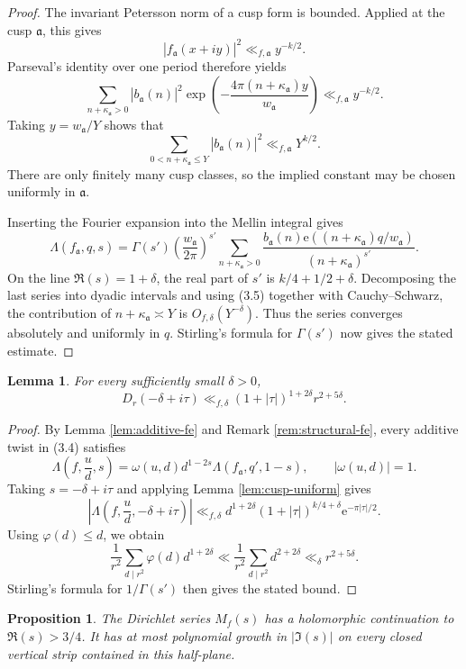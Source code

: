 \documentclass[11pt]{amsart}
\newtheorem{lemma}[theorem]{Lemma}
\newtheorem{proposition}[theorem]{Proposition}
\theoremstyle{remark}
\newcommand{\e}{\mathrm{e}}
\begin{document}
\begin{proof}
The invariant Petersson norm of a cusp form is bounded. Applied at the cusp
$\mathfrak a$, this gives
\[
|f_{\mathfrak a}(x+iy)|^2\ll_{f,\mathfrak a}y^{-k/2}.
\]
Parseval's identity over one period therefore yields
\[
\sum_{n+\kappa_{\mathfrak a}>0}|b_{\mathfrak a}(n)|^2
\exp\left(-\frac{4\pi(n+\kappa_{\mathfrak a})y}
{w_{\mathfrak a}}\right)
\ll_{f,\mathfrak a}y^{-k/2}.
\]
Taking $y=w_{\mathfrak a}/Y$ shows that
\[
\sum_{0<n+\kappa_{\mathfrak a}\le Y}|b_{\mathfrak a}(n)|^2
\ll_{f,\mathfrak a}Y^{k/2}.
\tag{3.5}
\]
There are only finitely many cusp classes, so the implied constant may be
chosen uniformly in $\mathfrak a$.

Inserting the Fourier expansion into the Mellin integral gives
\[
\Lambda(f_{\mathfrak a},q,s)
=\Gamma(s')\left(\frac{w_{\mathfrak a}}{2\pi}\right)^{s'}
\sum_{n+\kappa_{\mathfrak a}>0}
\frac{b_{\mathfrak a}(n)
\e((n+\kappa_{\mathfrak a})q/w_{\mathfrak a})}
{(n+\kappa_{\mathfrak a})^{s'}}.
\]
On the line $\Re(s)=1+\delta$, the real part of $s'$ is
$k/4+1/2+\delta$. Decomposing the last series into dyadic intervals and
using (3.5) together with Cauchy--Schwarz, the contribution of
$n+\kappa_{\mathfrak a}\asymp Y$ is $O_{f,\delta}(Y^{-\delta})$.
Thus the series converges absolutely and uniformly in $q$. Stirling's
formula for $\Gamma(s')$ now gives the stated estimate.
\end{proof}

\begin{lemma}\label{lem:left-bound}
For every sufficiently small $\delta>0$,
\[
D_r(-\delta+i\tau)\ll_{f,\delta}(1+|\tau|)^{1+2\delta}r^{2+5\delta}.
\]
\end{lemma}

\begin{proof}
By Lemma \ref{lem:additive-fe} and Remark \ref{rem:structural-fe}, every additive twist in (3.4) satisfies
\[
\Lambda\left(f,\frac ud,s\right)
=\omega(u,d)d^{1-2s}\Lambda(f_{\mathfrak a},q',1-s),
\qquad |\omega(u,d)|=1.
\]
Taking $s=-\delta+i\tau$ and applying Lemma \ref{lem:cusp-uniform} gives
\[
\left|\Lambda\left(f,\frac ud,-\delta+i\tau\right)\right|
\ll_{f,\delta}d^{1+2\delta}(1+|\tau|)^{k/4+\delta}\e^{-\pi|\tau|/2}.
\]
Using \(\varphi(d)\leq d\), we obtain
\[
\frac1{r^2}\sum_{d\mid r^2}\varphi(d)d^{1+2\delta}
\ll
\frac1{r^2}\sum_{d\mid r^2}d^{2+2\delta}
\ll_\delta r^{2+5\delta}.
\]
Stirling's formula for \(1/\Gamma(s')\) then gives the stated bound.
\end{proof}

\begin{proposition}\label{prop:continuation}
The Dirichlet series $M_f(s)$ has a holomorphic continuation to $\Re(s)>3/4$. It has at most polynomial growth in $|\Im(s)|$ on every closed vertical strip contained in this half-plane.
\end{proposition}
\end{document}
